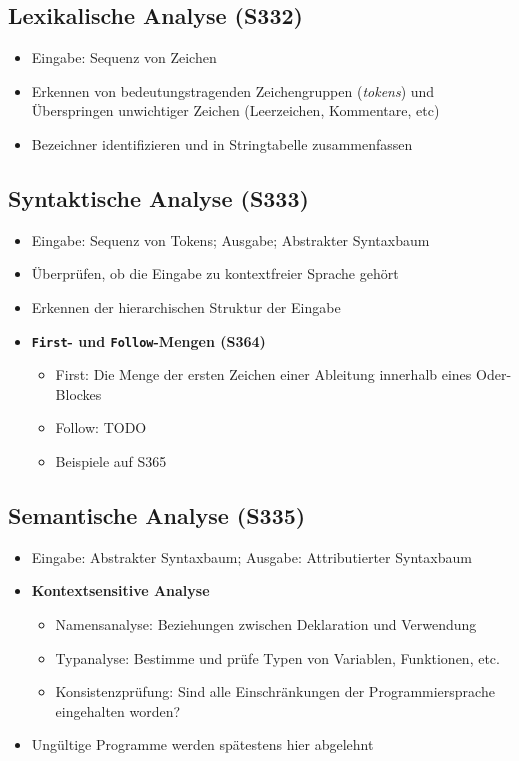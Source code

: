 \subsection{Lexikalische Analyse (S332)}
\begin{itemize}
	\item Eingabe: Sequenz von Zeichen
	\item Erkennen von bedeutungstragenden Zeichengruppen (\textit{tokens}) und Überspringen unwichtiger Zeichen (Leerzeichen, Kommentare, etc)
	\item Bezeichner identifizieren und in Stringtabelle zusammenfassen
\end{itemize}

\subsection{Syntaktische Analyse (S333)}
\begin{itemize}
	\item Eingabe: Sequenz von Tokens; Ausgabe; Abstrakter Syntaxbaum
	\item Überprüfen, ob die Eingabe zu kontextfreier Sprache gehört
	\item Erkennen der hierarchischen Struktur der Eingabe
	\item \textbf{\texttt{First}- und \texttt{Follow}-Mengen (S364)}
	\begin{itemize}
		\item First: Die Menge der ersten Zeichen einer Ableitung innerhalb eines Oder-Blockes
		\item Follow: TODO
		\item Beispiele auf S365
	\end{itemize}
\end{itemize}

\subsection{Semantische Analyse (S335)}
\begin{itemize}
	\item Eingabe: Abstrakter Syntaxbaum; Ausgabe: Attributierter Syntaxbaum
	\item \textbf{Kontextsensitive Analyse}
	\begin{itemize}
		\item Namensanalyse: Beziehungen zwischen Deklaration und Verwendung
		\item Typanalyse: Bestimme und prüfe Typen von Variablen, Funktionen, etc.
		\item Konsistenzprüfung: Sind alle Einschränkungen der Programmiersprache eingehalten worden?
	\end{itemize}
	\item Ungültige Programme werden spätestens hier abgelehnt
\end{itemize}

